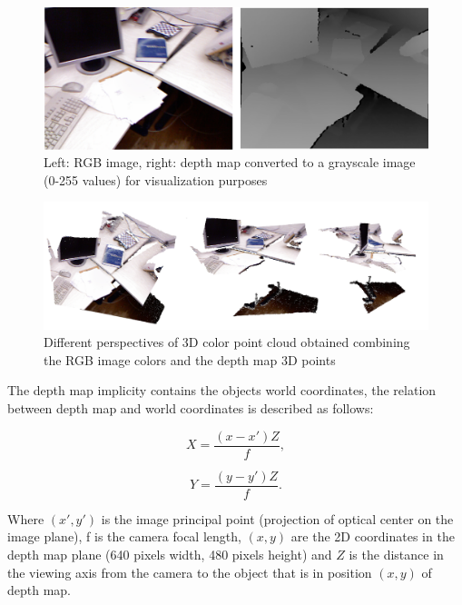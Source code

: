 \begin{figure}[h!]
\begin{center}
\includegraphics[scale=0.3]{images/color_depth.png}
\caption{Left: RGB image, right: depth map converted to a grayscale image (0-255 values) for visualization purposes}
\label{fig:colordepth}
\end{center}
\end{figure}


\begin{figure}[h!]
\begin{center}
\includegraphics[scale=0.25]{images/3d_point_cloud.png}
\caption{Different perspectives of 3D color point cloud obtained combining the RGB image colors and the depth map 3D points}
\label{fig:colorpcloud}
\end{center}
\end{figure}


The depth map implicity contains the objects world coordinates, the relation between depth map 
and world coordinates is described as follows:

\begin{equation}
\label{eq:depthmapx}
 X=\frac{(x-x')Z}{f},
\end{equation}

\begin{equation}
\label{eq:depthmapy}
 Y=\frac{(y-y')Z}{f}.
\end{equation}


\noindent Where $(x',y')$ is the image principal point (projection of optical center on the image plane), f is the camera 
focal length, $(x,y)$ are the 2D coordinates in the depth map plane (640 pixels width, 480 pixels height) and $Z$ is the distance in the viewing axis from the camera to the object that is in position $(x,y)$ of depth map.

